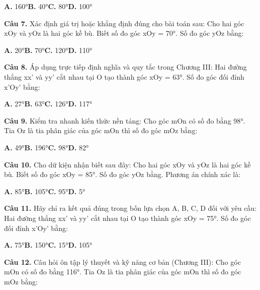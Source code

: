 \documentclass[11pt,a4paper]{article}
\begin{document}
\hspace*{1.5em}\textbf{A.} 160°\quad\quad \textbf{B.} 40°\quad\quad \textbf{C.} 80°\quad\quad \textbf{D.} 100°\par\vspace{2pt}
\textbf{\color{primary} Câu 7.} Xác định giá trị hoặc khẳng định đúng cho bài toán sau: Cho hai góc xOy và yOz là hai góc kề bù. Biết số đo góc xOy = 70°. Số đo góc yOz bằng:\par
\hspace*{1.5em}\textbf{A.} 20°\quad\quad \textbf{B.} 70°\quad\quad \textbf{C.} 120°\quad\quad \textbf{D.} 110°\par\vspace{2pt}
\textbf{\color{primary} Câu 8.} Áp dụng trực tiếp định nghĩa và quy tắc trong Chương III: Hai đường thẳng xx' và yy' cắt nhau tại O tạo thành góc xOy = 63°. Số đo góc đối đỉnh x'Oy' bằng:\par
\hspace*{1.5em}\textbf{A.} 27°\quad\quad \textbf{B.} 63°\quad\quad \textbf{C.} 126°\quad\quad \textbf{D.} 117°\par\vspace{2pt}
\textbf{\color{primary} Câu 9.} Kiểm tra nhanh kiến thức nền tảng: Cho góc mOn có số đo bằng 98°. Tia Oz là tia phân giác của góc mOn thì số đo góc mOz bằng:\par
\hspace*{1.5em}\textbf{A.} 49°\quad\quad \textbf{B.} 196°\quad\quad \textbf{C.} 98°\quad\quad \textbf{D.} 82°\par\vspace{2pt}
\textbf{\color{primary} Câu 10.} Cho dữ kiện nhận biết sau đây: Cho hai góc xOy và yOz là hai góc kề bù. Biết số đo góc xOy = 85°. Số đo góc yOz bằng. Phương án chính xác là:\par
\hspace*{1.5em}\textbf{A.} 85°\quad\quad \textbf{B.} 105°\quad\quad \textbf{C.} 95°\quad\quad \textbf{D.} 5°\par\vspace{2pt}
\textbf{\color{primary} Câu 11.} Hãy chỉ ra kết quả đúng trong bốn lựa chọn A, B, C, D đối với yêu cầu: Hai đường thẳng xx' và yy' cắt nhau tại O tạo thành góc xOy = 75°. Số đo góc đối đỉnh x'Oy' bằng:\par
\hspace*{1.5em}\textbf{A.} 75°\quad\quad \textbf{B.} 150°\quad\quad \textbf{C.} 15°\quad\quad \textbf{D.} 105°\par\vspace{2pt}
\textbf{\color{primary} Câu 12.} Câu hỏi ôn tập lý thuyết và kỹ năng cơ bản (Chương III): Cho góc mOn có số đo bằng 116°. Tia Oz là tia phân giác của góc mOn thì số đo góc mOz bằng:\par
\end{document}
